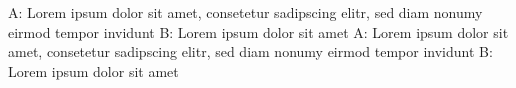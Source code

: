 \documentclass[svgnames]{book}
\newcommand{\widebox}[2]{\colorbox{#1}{\makebox[\paperwidth]{#2}}}
\newenvironment{shadeda}{%
    \def\FrameCommand{\fboxsep=1ex \widebox{Wheat}}%
                      \MakeFramed {\FrameRestore}}%
                     {\endMakeFramed}
\newenvironment{shadedb}{%
    \def\FrameCommand{\fboxsep=1ex \widebox{Cornsilk}}%
                      \MakeFramed {\FrameRestore}}%
                     {\endMakeFramed}
\newcommand{\asays} [1]{\begin{shadeda}A: #1\end{shadeda}\vspace{-20pt}}
\newcommand{\bsays} [1]{\begin{shadedb}B: #1\end{shadedb}\vspace{-20pt}}
\begin{document}
    \asays {Lorem ipsum dolor sit amet, consetetur sadipscing elitr, sed diam nonumy eirmod tempor invidunt}
    \bsays {Lorem ipsum dolor sit amet}
    \asays {Lorem ipsum dolor sit amet, consetetur sadipscing elitr, sed diam nonumy eirmod tempor invidunt}
    \bsays {Lorem ipsum dolor sit amet}
    
\end{document}

